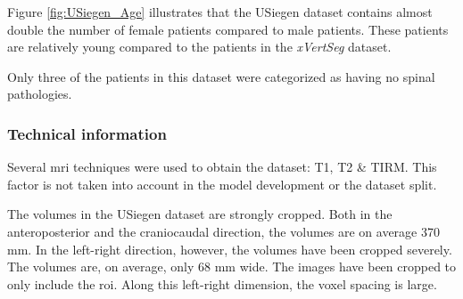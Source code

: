 Figure \ref{fig:USiegen_Age} illustrates that the USiegen dataset contains almost double the number of female patients compared to male patients.
These patients are relatively young compared to the patients in the \textit{xVertSeg} dataset.

Only three of the patients in this dataset were categorized as having no spinal pathologies.

\subsubsection{Technical information}

Several \acrlong{mri} techniques were used to obtain the dataset: T1, T2 \& TIRM.
This factor is not taken into account in the model development or the dataset split.

The volumes in the USiegen dataset are strongly cropped. 
Both in the anteroposterior and the craniocaudal direction, the volumes are on average 370 mm.
In the left-right direction, however, the volumes have been cropped severely. The volumes are, on average, only 68 mm wide.
The images have been cropped to only include the \acrshort{roi}.
Along this left-right dimension, the voxel spacing is large. 


